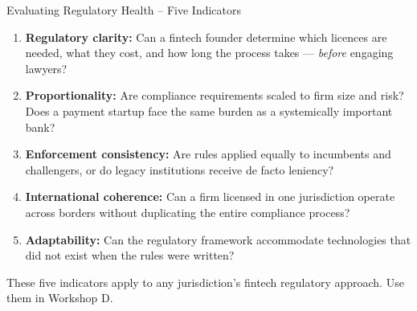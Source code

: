 \begin{frame}{Evaluating Regulatory Health -- Five Indicators}
  \begin{enumerate}
    \item \textcolor{mlpurple}{\textbf{Regulatory clarity:}} Can a fintech founder
          determine which licences are needed, what they cost, and how long the
          process takes --- \emph{before} engaging lawyers?
    \vspace{0.3em}
    \item \textcolor{mlblue}{\textbf{Proportionality:}} Are compliance requirements
          scaled to firm size and risk? Does a payment startup face the same burden
          as a systemically important bank?
    \vspace{0.3em}
    \item \textcolor{mlgreen}{\textbf{Enforcement consistency:}} Are rules applied
          equally to incumbents and challengers, or do legacy institutions receive
          de facto leniency?
    \vspace{0.3em}
    \item \textcolor{mlorange}{\textbf{International coherence:}} Can a firm licensed
          in one jurisdiction operate across borders without duplicating the entire
          compliance process?
    \vspace{0.3em}
    \item \textcolor{mlteal}{\textbf{Adaptability:}} Can the regulatory framework
          accommodate technologies that did not exist when the rules were written?
  \end{enumerate}
  \vspace{0.3em}
  \begin{block}{}
    These five indicators apply to any jurisdiction's fintech regulatory approach.
    Use them in Workshop D.
  \end{block}
\end{frame}

